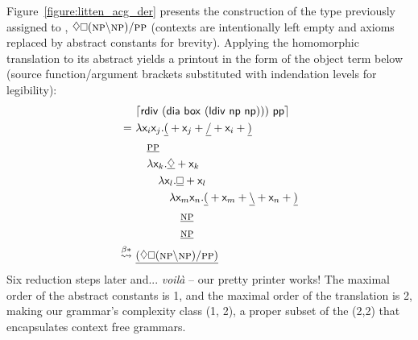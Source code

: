 Figure~\ref{figure:litten_acg_der} presents the construction of the type previously assigned to , $\diamond\bx (\np[s]\divleft\np[s])\divright\pp[s]$ (contexts are intentionally left empty and axioms replaced by abstract constants for brevity).
Applying the homomorphic translation to its abstract yields a printout in the form of the object term below (source function/argument brackets substituted with indendation levels for legibility):
\begin{equation}
	{
	\begin{aligned}
	& 			\hm{\term{rdiv~(dia~box~(ldiv~np~np)))~pp}}\\
	= \
	&				\smallterm{\lam  \vari\varj.\underline{(} + \varj + \underline{\divright} + \vari + \underline{)}}\\
	& \quad			\underline{\smallprop{pp}}\\
	& \quad 		\smallterm{\lam  \vark.\underline{\diamond} + \vark}\\
	& \qquad 		\smallterm{\lam  \varl.\underline{\bx} + \varl}\\
	& \qqquad		\smallterm{\lam  \Var{m}\Var{n}.\underline{(} + \Var{m} + \underline{\divleft} + \Var{n} + \underline{)}} \\
	& \qqqquad		\underline{\smallprop{np}}\\
	& \qqqquad		\underline{\smallprop{np}}\\
	\bredstar \
	&				\underline{(
						\diamond \bx ( \np \divleft \np )
						\divright \pp[s] 
						)}
	\end{aligned}
	}
\end{equation}
Six reduction steps later and... \textit{voil\`{a}} -- our pretty printer works!
The maximal order of the abstract constants is 1, and the maximal order of the translation is 2, making our grammar's complexity class (1, 2), a proper subset of the (2,2) that encapsulates context free grammars.

